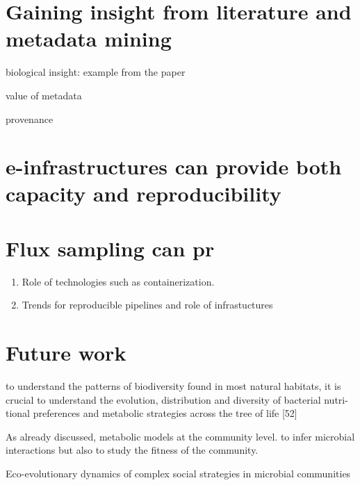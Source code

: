 \section{Gaining insight from literature and metadata mining}
\label{chap:concl-associations}

   biological insight: example from the paper 


   value of metadata 

   provenance 



\section{e-infrastructures can provide both capacity and reproducibility}
\label{chap:comp}



\section{Flux sampling can pr}
\label{chap:concl-met-nets}



   \begin{enumerate}
      \item Role of technologies such as containerization. 
      \item Trends for reproducible pipelines and role of infrastuctures
   \end{enumerate}


\section{Future work}
\label{chap:fut-wor}


   to understand the patterns of biodiversity
   found in most natural habitats, it is crucial to understand
   the evolution, distribution and diversity of bacterial nutri-
   tional preferences and metabolic strategies across the tree
   of life [52]    \citep{bajic2020ecology}



   As already discussed, metabolic models 
   at the community level. 
   to infer microbial interactions but also to study the fitness of the community. 


   Eco-evolutionary dynamics of complex social strategies in microbial communities~\citep{harrington2014eco}







